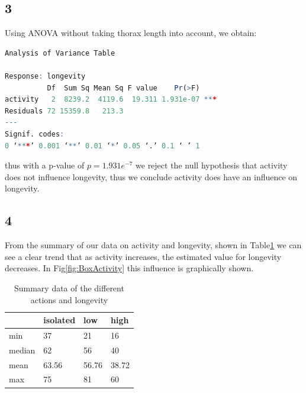 \documentclass{article}
\begin{document}
    \subsection*{3}
      Using ANOVA without taking thorax length into account, we obtain:
            \begin{lstlisting}[language=R]
Analysis of Variance Table

Response: longevity
          Df  Sum Sq Mean Sq F value    Pr(>F)    
activity   2  8239.2  4119.6  19.311 1.931e-07 ***
Residuals 72 15359.8   213.3                      
---
Signif. codes:  
0 ‘***’ 0.001 ‘**’ 0.01 ‘*’ 0.05 ‘.’ 0.1 ‘ ’ 1          
      \end{lstlisting}
      thus with a p-value of $p=1.931e^{-7}$ we reject the null hypothesis that activity does not influence longevity, thus we conclude activity does have an influence on longevity.

    \subsection*{4}
      From the summary of our data on activity and longevity, shown in Table\ref{table:SumAction} we can see a clear trend that as activity increases, the estimated value for longevity decreases.
      In Fig\ref{fig:BoxActivity} this influence is graphically shown.
      \begin{table}[H]
      \begin{center}
      \begin{tabular}{l|lll}
          \hline
                  & isolated& low & high \\
          \hline
          min     & 37      & 21  & 16 \\
          median  & 62      & 56  & 40 \\
          mean    & 63.56   & 56.76 & 38.72  \\
          max     & 75      & 81  & 60 \\
          \hline
      \end{tabular}
      \caption{Summary data of the different actions and longevity}
      \label{table:SumAction}
      \end{center}
      \end{table}
      
\end{document}
